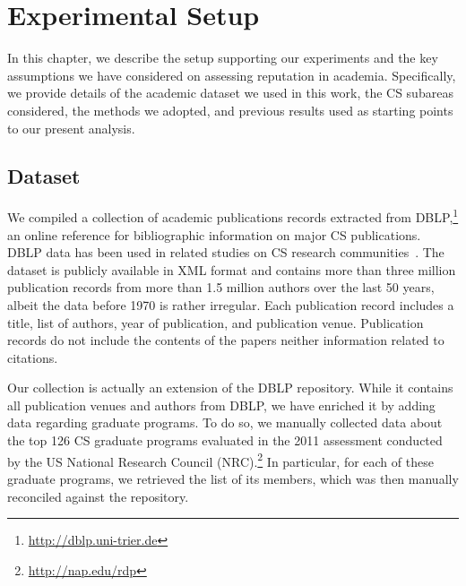 \documentclass[msc]{ppgccufmg}
\begin{document}

\chapter{Experimental Setup}\label{sec:setup}

In this chapter, we describe the setup supporting our experiments and the key assumptions we have considered on assessing reputation in academia. Specifically, we provide details of the academic dataset we used in this work, the CS subareas considered, the methods we adopted, and previous results used as starting points to our present analysis.

\section{Dataset}


We compiled a collection of academic publications records extracted from DBLP,\footnote{\url{http://dblp.uni-trier.de}} an online reference for bibliographic information on major CS publications. DBLP data has been used in related studies on CS research communities~\citep{biryukov10,delgado14,hoonlor13,laender2008,wainer13}. 
%
The dataset is publicly available in XML format and contains more than three million publication records from more than 1.5 million authors over the last 50 years, albeit the data before 1970 is rather irregular. Each publication record includes a title, list of authors, year of publication, and publication venue. Publication records do not include the contents of the papers neither information related to citations.

Our collection is actually an extension of the DBLP repository. While it contains all publication venues and authors from DBLP, we have enriched it by adding data regarding graduate programs. To do so, we manually collected data about the top 126  CS graduate programs evaluated in the 2011 assessment conducted by the US National Research Council (NRC).\footnote{\url{http://nap.edu/rdp}}
%
In particular, for each of these graduate programs, we retrieved the list of its members, which was then manually reconciled against the repository.
\end{document}
